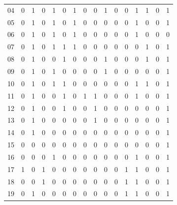 \begin{esempio}
\begin{table}[H]
\begin{tabular}{c|ccccccccccccccc}
    04 & 0 & 1 & 0 & 1 & 0 & 1 & 0 & 0 & 1 & 0 & 0 & 1 & 1 & 0 & 1 \\
    05 & 0 & 1 & 0 & 1 & 0 & 1 & 0 & 0 & 0 & 0 & 0 & 1 & 0 & 0 & 1 \\
    06 & 0 & 1 & 0 & 1 & 0 & 1 & 0 & 0 & 0 & 0 & 0 & 1 & 0 & 0 & 0 \\
    07 & 0 & 1 & 0 & 1 & 1 & 1 & 0 & 0 & 0 & 0 & 0 & 0 & 1 & 0 & 1 \\
    08 & 0 & 1 & 0 & 0 & 1 & 0 & 0 & 0 & 1 & 0 & 0 & 0 & 1 & 0 & 1 \\
    09 & 0 & 1 & 0 & 1 & 0 & 0 & 0 & 0 & 1 & 0 & 0 & 0 & 0 & 0 & 1 \\
    10 & 0 & 1 & 0 & 1 & 1 & 0 & 0 & 0 & 0 & 0 & 0 & 1 & 1 & 0 & 1 \\
    11 & 0 & 1 & 0 & 0 & 1 & 0 & 1 & 1 & 0 & 0 & 0 & 1 & 0 & 0 & 1 \\
    12 & 0 & 1 & 0 & 0 & 1 & 0 & 0 & 1 & 0 & 0 & 0 & 0 & 0 & 0 & 1 \\
    13 & 0 & 1 & 0 & 0 & 0 & 0 & 0 & 1 & 0 & 0 & 0 & 0 & 0 & 0 & 1 \\
    14 & 0 & 1 & 0 & 0 & 0 & 0 & 0 & 0 & 0 & 0 & 0 & 0 & 0 & 0 & 1 \\
    15 & 0 & 0 & 0 & 0 & 0 & 0 & 0 & 0 & 0 & 0 & 0 & 0 & 0 & 0 & 1 \\
    16 & 0 & 0 & 0 & 1 & 0 & 0 & 0 & 0 & 0 & 0 & 0 & 1 & 0 & 0 & 1 \\
    17 & 1 & 0 & 1 & 0 & 0 & 0 & 0 & 0 & 0 & 0 & 1 & 1 & 0 & 0 & 1 \\
    18 & 0 & 0 & 1 & 0 & 0 & 0 & 0 & 0 & 0 & 0 & 1 & 1 & 0 & 0 & 1 \\ 
    19 & 0 & 1 & 0 & 0 & 0 & 0 & 0 & 0 & 0 & 0 & 1 & 1 & 0 & 0 & 1
  \end{tabular}
\end{table}
\end{esempio}
